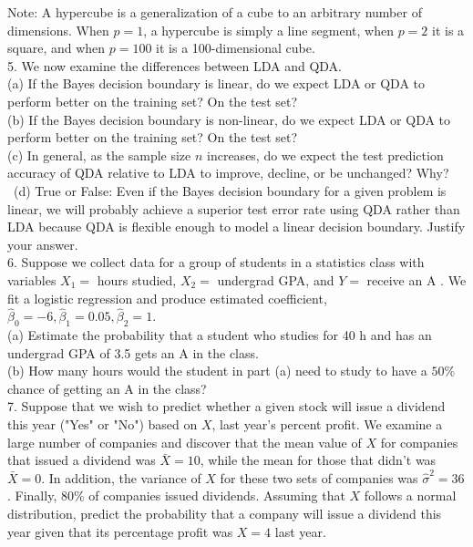 \documentclass[10pt]{article}
\begin{document}
Note: A hypercube is a generalization of a cube to an arbitrary number of dimensions. When $p=1$, a hypercube is simply a line segment, when $p=2$ it is a square, and when $p=100$ it is a 100-dimensional cube.\\
5. We now examine the differences between LDA and QDA.\\
(a) If the Bayes decision boundary is linear, do we expect LDA or QDA to perform better on the training set? On the test set?\\
(b) If the Bayes decision boundary is non-linear, do we expect LDA or QDA to perform better on the training set? On the test set?\\
(c) In general, as the sample size $n$ increases, do we expect the test prediction accuracy of QDA relative to LDA to improve, decline, or be unchanged? Why?\
\
(d) True or False: Even if the Bayes decision boundary for a given problem is linear, we will probably achieve a superior test error rate using QDA rather than LDA because QDA is flexible enough to model a linear decision boundary. Justify your answer.\\
6. Suppose we collect data for a group of students in a statistics class with variables $X_{1}=$ hours studied, $X_{2}=$ undergrad GPA, and $Y=$ receive an A . We fit a logistic regression and produce estimated coefficient, $\hat{\beta}_{0}=-6, \hat{\beta}_{1}=0.05, \hat{\beta}_{2}=1$.\\
(a) Estimate the probability that a student who studies for 40 h and has an undergrad GPA of 3.5 gets an A in the class.\\
(b) How many hours would the student in part (a) need to study to have a $50 \%$ chance of getting an A in the class?\\
7. Suppose that we wish to predict whether a given stock will issue a dividend this year ("Yes" or "No") based on $X$, last year's percent profit. We examine a large number of companies and discover that the mean value of $X$ for companies that issued a dividend was $\bar{X}=10$, while the mean for those that didn't was $\bar{X}=0$. In addition, the variance of $X$ for these two sets of companies was $\hat{\sigma}^{2}=36$. Finally, $80 \%$ of companies issued dividends. Assuming that $X$ follows a normal distribution, predict the probability that a company will issue a dividend this year given that its percentage profit was $X=4$ last year.
\end{document}
